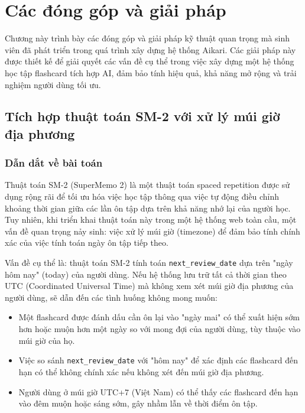 \documentclass[../DoAn.tex]{subfiles}
\begin{document}
\chapter{Các đóng góp và giải pháp}

Chương này trình bày các đóng góp và giải pháp kỹ thuật quan trọng mà sinh viên đã phát triển trong quá trình xây dựng hệ thống Aikari. Các giải pháp này được thiết kế để giải quyết các vấn đề cụ thể trong việc xây dựng một hệ thống học tập flashcard tích hợp AI, đảm bảo tính hiệu quả, khả năng mở rộng và trải nghiệm người dùng tối ưu.

\section{Tích hợp thuật toán SM-2 với xử lý múi giờ địa phương}
\label{section:5.1}

\subsection{Dẫn dắt về bài toán}
\label{subsection:5.1.1}

Thuật toán SM-2 (SuperMemo 2) là một thuật toán spaced repetition được sử dụng rộng rãi để tối ưu hóa việc học tập thông qua việc tự động điều chỉnh khoảng thời gian giữa các lần ôn tập dựa trên khả năng nhớ lại của người học. Tuy nhiên, khi triển khai thuật toán này trong một hệ thống web toàn cầu, một vấn đề quan trọng nảy sinh: việc xử lý múi giờ (timezone) để đảm bảo tính chính xác của việc tính toán ngày ôn tập tiếp theo.

Vấn đề cụ thể là: thuật toán SM-2 tính toán \texttt{next\_review\_date} dựa trên "ngày hôm nay" (today) của người dùng. Nếu hệ thống lưu trữ tất cả thời gian theo UTC (Coordinated Universal Time) mà không xem xét múi giờ địa phương của người dùng, sẽ dẫn đến các tình huống không mong muốn:

\begin{itemize}
    \item Một flashcard được đánh dấu cần ôn lại vào "ngày mai" có thể xuất hiện sớm hơn hoặc muộn hơn một ngày so với mong đợi của người dùng, tùy thuộc vào múi giờ của họ.
    \item Việc so sánh \texttt{next\_review\_date} với "hôm nay" để xác định các flashcard đến hạn có thể không chính xác nếu không xét đến múi giờ địa phương.
    \item Người dùng ở múi giờ UTC+7 (Việt Nam) có thể thấy các flashcard đến hạn vào đêm muộn hoặc sáng sớm, gây nhầm lẫn về thời điểm ôn tập.
\end{itemize}
\end{document}

